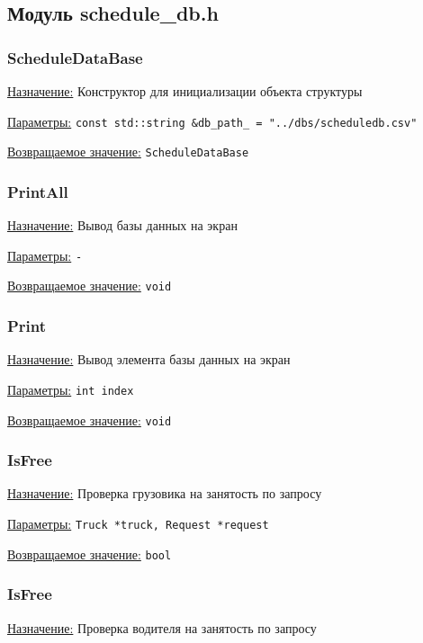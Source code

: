 \subsection{Модуль schedule\_db.h}


\subsubsection{ScheduleDataBase}

\underline{Назначение:}
Конструктор для инициализации объекта структуры

\underline{Параметры:} \verb|const std::string &db_path_ = "../dbs/scheduledb.csv"|

\underline{Возвращаемое значение:} \verb|ScheduleDataBase|


\subsubsection{PrintAll}

\underline{Назначение:}
Вывод базы данных на экран

\underline{Параметры:} \verb|-|

\underline{Возвращаемое значение:} \verb|void|


\subsubsection{Print}

\underline{Назначение:}
Вывод элемента базы данных на экран

\underline{Параметры:} \verb|int index|

\underline{Возвращаемое значение:} \verb|void|


\subsubsection{IsFree}

\underline{Назначение:}
Проверка грузовика на занятость по запросу

\underline{Параметры:} \verb|Truck *truck, Request *request|

\underline{Возвращаемое значение:} \verb|bool|


\subsubsection{IsFree}

\underline{Назначение:}
Проверка водителя на занятость по запросу

